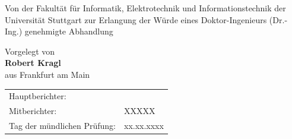 





\begin{titlepage}

\noindent


\vspace*{5mm}

\begin{center}
	\onehalfspacing \LARGE \sffamily \textbf {\varTitle}
\end{center}

\vspace*{12mm}

\begin{center}
	\sffamily
	\large
	Von der Fakultät für Informatik, Elektrotechnik und Informationstechnik der Universität Stuttgart zur Erlangung der Würde eines Doktor-Ingenieurs (Dr.-Ing.) genehmigte Abhandlung
\end{center}

\vspace*{12mm}
\begin{center}
	\sffamily
	\large
	Vorgelegt von\\
	\vspace*{3mm}
	\textbf{\Large Robert Kragl}\\
	\vspace*{3mm}
	aus Frankfurt am Main
\end{center}



\vspace{12mm}
\sffamily
\singlespacing
\large
\begin{tabular}{@{}ll@{}}
	Hauptberichter: & \varSupA \\
	Mitberichter: & XXXXX \\
	Tag der mündlichen Prüfung: & xx.xx.xxxx
\end{tabular}


\end{titlepage}
